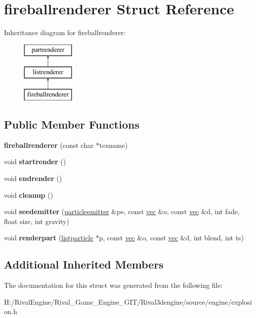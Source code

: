 \hypertarget{structfireballrenderer}{}\section{fireballrenderer Struct Reference}
\label{structfireballrenderer}
Inheritance diagram for fireballrenderer\+:\begin{figure}[H]
\begin{center}
\leavevmode
\includegraphics[height=3.000000cm]{structfireballrenderer}
\end{center}
\end{figure}
\subsection*{Public Member Functions}
\begin{DoxyCompactItemize}
\item 
\mbox{\label{structfireballrenderer_ab3992508fffa9c1c6b9cedb9176af80d}} 
{\bfseries fireballrenderer} (const char $\ast$texname)
\item 
\mbox{\label{structfireballrenderer_a0b40a6ece84870bca876d9167e61bcde}} 
void {\bfseries startrender} ()
\item 
\mbox{\label{structfireballrenderer_a33dc996cf788481609db34931befce84}} 
void {\bfseries endrender} ()
\item 
\mbox{\label{structfireballrenderer_a3bc220d8feec217c8d40c3897011a072}} 
void {\bfseries cleanup} ()
\item 
\mbox{\label{structfireballrenderer_a83cccdc466e176976c2ebc6dda08c563}} 
void {\bfseries seedemitter} (\hyperlink{structparticleemitter}{particleemitter} \&pe, const \hyperlink{structvec}{vec} \&o, const \hyperlink{structvec}{vec} \&d, int fade, float size, int gravity)
\item 
\mbox{\label{structfireballrenderer_ad5556d06bf0d507693da3971a1a9f74f}} 
void {\bfseries renderpart} (\hyperlink{structlistparticle}{listparticle} $\ast$p, const \hyperlink{structvec}{vec} \&o, const \hyperlink{structvec}{vec} \&d, int blend, int ts)
\end{DoxyCompactItemize}
\subsection*{Additional Inherited Members}


The documentation for this struct was generated from the following file\+:\begin{DoxyCompactItemize}
\item 
H\+:/\+Rival\+Engine/\+Rival\+\_\+\+Game\+\_\+\+Engine\+\_\+\+G\+I\+T/\+Rival3dengine/source/engine/explosion.\+h\end{DoxyCompactItemize}
